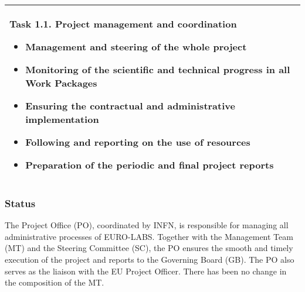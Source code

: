 \begin{table}[H]
\begin{tabular}{|p{}|}
        \begin{minipage}[t]{\textwidth}
        \setlength{\parindent}{15pt}
                Task 1.1. Project management and coordination
    		\begin{itemize}
    		    \item Management and steering of the whole project
                    \item Monitoring of the scientific and technical progress in all Work Packages
                    \item Ensuring the contractual and administrative implementation
                    \item Following and reporting on the use of resources
                    \item Preparation of the periodic and final project reports
    		\end{itemize} 
    		\vspace*{0.10em}
	\end{minipage}        
        \\
        \hline
    \end{tabular}
    \vspace{0.5em}\vfill
\end{table}




\subsubsection*{Status}
The Project Office (PO), coordinated by INFN, is responsible for managing all administrative processes
of EURO-LABS. Together with the Management Team (MT) and the Steering Committee
(SC), the PO ensures the smooth and timely execution of the project and reports to the Governing
Board (GB). The PO also serves as the liaison with the EU Project Officer. There has been no change in the composition of the MT.

